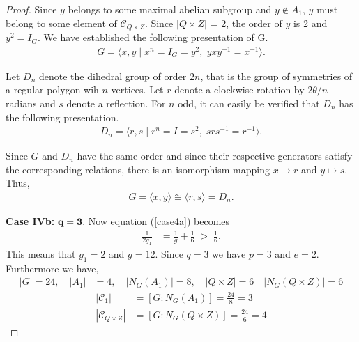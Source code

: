 \begin{proof}




Since $y$ belongs to some maximal abelian subgroup and $y \not \in A_1$, $y$ must belong to some element of $\mathcal{C}_{Q \times Z}$. Since $|Q \times Z|$ = 2, the order of $y$ is 2 and $y^2 = I_G$. We have established the following presentation of G.
\begin{align*} G = \langle x, y \; | \; x^n = I_G = y^2, \; y x y^{-1} = x^{-1} \rangle.
\end{align*}

Let $D_n$ denote the dihedral group of order $2n$, that is the group of symmetries of a regular polygon wih $n$ vertices. Let $r$ denote a clockwise rotation by $2\theta /n$ radians and $s$ denote a reflection. For $n$ odd, it can easily be verified that $D_n$ has the following presentation.
\begin{align*} D_n = \langle r, s \; | \; r^n = I = s^2, \; s r s^{-1} = r^{-1} \rangle.
\end{align*}

Since $G$ and $D_n$ have the same order and since their respective generators satisfy the corresponding relations, there is an isomorphism mapping $x \mapsto r$ and $y \mapsto s$. Thus,
\begin{align*} G = \langle x, y \rangle \cong \langle r, s \rangle = D_n.
\end{align*}

 \space \textbf{Case IVb:} $\pmb{q = 3}$. Now equation (\ref{case4a}) becomes
\begin{align*} \frac{1}{2g_1} &= \frac{1}{g} + \frac{1}{6} \; > \; \frac{1}{6}.
\end{align*}
This means that $g_1 = 2$ and $g = 12$. Since $q=3$ we have $p=3$ and $e=2$. Furthermore we have,
\begin{align*} |G| = 24, \quad |A_1| &= 4,  \quad |N_G(A_1)| = 8, \quad |Q \times Z| = 6 \quad |N_G(Q \times Z)| = 6
\end{align*}
\begin{align*} |\mathcal{C}_1| &= [G : N_G(A_1)] = \frac{24}{8} = 3
\\ |\mathcal{C}_{Q \times Z}| &= [G : N_G(Q \times Z)] = \frac{24}{6} = 4
\end{align*}


\end{proof}
